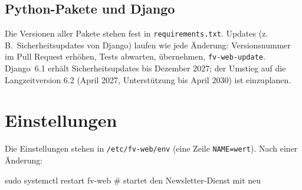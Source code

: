 \documentclass[a4paper,fontsize=10pt]{scrartcl}
\newcommand*{\cmd}[1]{\texttt{#1}}
\newcommand*{\pfad}[1]{\texttt{#1}}
\begin{document}
\subsection{Python-Pakete und Django}

Die Versionen aller Pakete stehen fest in \pfad{requirements.txt}. Updates
(z.\,B.\ Sicherheitsupdates von Django) laufen wie jede Änderung: Versionsnummer im
Pull Request erhöhen, Tests abwarten, übernehmen, \cmd{fv-web-update}. Django~6.1
erhält Sicherheitsupdates bis Dezember 2027; der Umstieg auf die Langzeitversion
6.2 (April 2027, Unterstützung bis April 2030) ist einzuplanen.

\section{Einstellungen}\label{sec:einstellungen}

Die Einstellungen stehen in \pfad{/etc/fv-web/env} (eine Zeile \cmd{NAME=wert}).
Nach einer Änderung:

\begin{befehl}
sudo systemctl restart fv-web      # startet den Newsletter-Dienst mit neu
\end{befehl}
\end{document}
